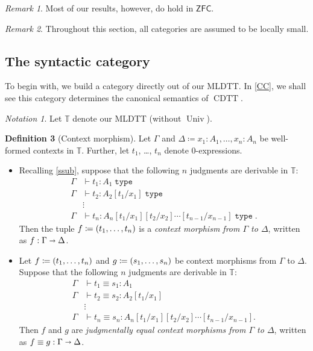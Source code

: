 \documentclass[10pt,letterpaper,cm]{nupset}
\theoremstyle{definition}
\newtheorem{definition}{Definition}[subsection]
\theoremstyle{theorem}
\theoremstyle{remark}
\newtheorem{remark}[definition]{Remark}
\newtheorem*{notation}{Notation}
\newcommand{\sra}{\shortrightarrow}
\newcommand{\0}{\mathbf{0}}
\newcommand{\1}{\mathbf{1}}
\newcommand{\2}{\mathbf{2}}
\DeclareMathOperator{\type}{\mathtt{type}}
\DeclareMathOperator{\cdtt}{\mathrm{CDTT}}
\DeclareMathOperator{\univ}{\mathrm{Univ}}
\newcommand{\T}{\mathbb T}
\newcommand{\bi}{\begin{itemize}}
\newcommand{\ei}{\end{itemize}}
\begin{document}
\begin{remark}
Most of our results, however, do hold in $\mathsf{ZFC}$.
\end{remark}

\smallskip

\begin{remark}
Throughout this section, all categories are assumed to be locally small. 
\end{remark}

\subsection{The syntactic category}

To begin with,  we build a category directly out of our MLDTT. In \cref{CC}, we shall see  this category determines the canonical semantics of $\cdtt$.  

\begin{notation}
Let $\T$ denote our MLDTT (without $\univ$).
\end{notation}

\begin{definition}[Context morphism]
Let $\Gamma$ and $\Delta \coloneqq {x_1 :A_1, \ldots, x_n :A_n}$ be well-formed contexts in $\T$. Further, let $t_1$, \ldots, $t_n$ denote $0$-expressions.
\bi
\item Recalling \cref{ssub}, suppose that the following $n$ judgments are derivable in $\T$:
\begin{align*}
\Gamma & \vdash t_1 : A_1 \type
\\ \Gamma & \vdash t_2 : A_2[t_1/x_1] \type
\\ & \vdots
\\ \Gamma & \vdash  t_n : A_n[t_1/x_1][t_2/x_2]\cdots[t_{n-1}/x_{n-1}] \type.
\end{align*}
Then the tuple $f\coloneqq \mleft(t_1, \ldots, t_n \mright)$ is a \textit{context morphism from $\Gamma$ to $\Delta$}, written as $f : \Gamma \sra \Delta$.
\item Let $f \coloneqq \mleft(t_1, \ldots, t_n \mright)$ and $g\coloneqq \mleft(s_1, \ldots, s_n \mright)$ be context morphisms from $\Gamma$ to $\Delta$. Suppose that the following $n$ judgments are derivable in $\T$:
\begin{align*}
\Gamma & \vdash t_1 \equiv s_1 : A_1 
\\ \Gamma & \vdash t_2 \equiv s_2 : A_2[t_1/x_1]
\\ & \vdots
\\ \Gamma & \vdash  t_n\equiv s_n : A_n[t_1/x_1][t_2/x_2]\cdots[t_{n-1}/x_{n-1}] .
\end{align*}
Then $f$ and $g$ are \textit{judgmentally equal context morphisms from $\Gamma$ to $\Delta$}, written as \linebreak $f \equiv g :  \Gamma \sra \Delta$.
\ei 
\end{definition}
\end{document}
